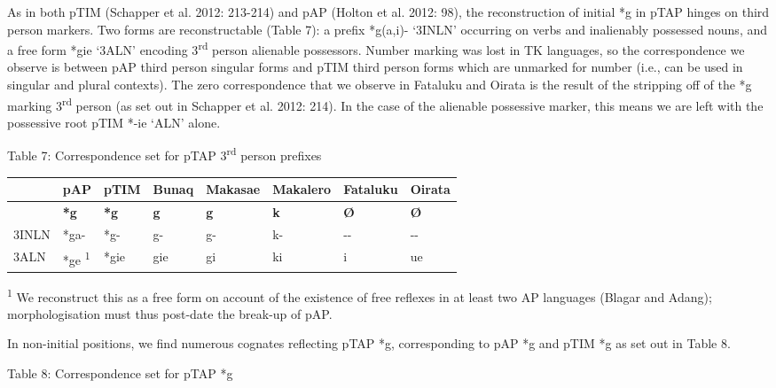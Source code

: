 As in both pTIM (Schapper et al. 2012: 213-214) and pAP (Holton et al. 2012: 98), the reconstruction of initial *g in pTAP hinges on third person markers. Two forms are reconstructable (Table 7): a prefix *g(a,i)- {\textquoteleft}3INLN{\textquoteright} occurring on verbs and inalienably possessed nouns, and a free form *gie {\textquoteleft}3ALN{\textquoteright} encoding 3\textsuperscript{rd} person alienable possessors. Number marking was lost in TK languages, so the correspondence we observe is between pAP third person singular forms and pTIM third person forms which are unmarked for number (i.e., can be used in singular and plural contexts). The zero correspondence that we observe in Fataluku and Oirata is the result of the stripping off of the *g marking 3\textsuperscript{rd} person (as set out in Schapper et al. 2012: 214). In the case of the alienable possessive marker, this means we are left with the possessive root pTIM *-ie {\textquoteleft}ALN{\textquoteright} alone.

{\centering
Table 7: Correspondence set for pTAP 3\textsuperscript{rd} person prefixes
\par}

\begin{center}
\tablehead{}
\begin{supertabular}{m{0.9406598in}m{0.6650598in}m{0.5170598in}m{0.6955598in}m{0.6962598in}m{0.6955598in}m{0.6962598in}m{0.6969598in}}
\hline
 &
pAP &
pTIM &
Bunaq &
Makasae &
Makalero &
Fataluku &
Oirata\\\hline
 &
\textbf{*g} &
\textbf{*g} &
\textbf{g} &
\textbf{g} &
\textbf{k} &
\textbf{{\O}} &
\textbf{{\O}}\\\hline
3INLN &
*ga- &
*g- &
g- &
g- &
k- &
{}-{}- &
{}-{}-\\
3ALN &
*ge \textsuperscript{1} &
*gie &
gie &
gi &
ki &
i &
ue\\\hline
\end{supertabular}
\end{center}
\textsuperscript{1} We reconstruct this as a free form on account of the existence of free reflexes in at least two AP languages (Blagar and Adang); morphologisation must thus post-date the break-up of pAP. 

In non-initial positions, we find numerous cognates reflecting pTAP *g, corresponding to pAP *g and pTIM *g as set out in Table 8. 

{\centering
Table 8: Correspondence set for pTAP *g
\par}

